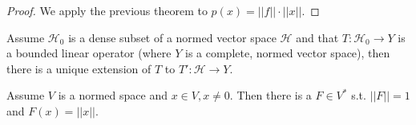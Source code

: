 \ifdetailed
\begin{proof}
    We apply the previous theorem to \(p(x)=||f||\cdot ||x||\).
\end{proof}
\fi 
\begin{theorem}
    Assume \(\mathcal{H}_0\) is a dense subset of a normed vector space \(\mathcal{H}\) and that \(T:\mathcal{H}_0\rightarrow Y\) is a bounded linear operator (where \(Y\) is a complete, normed vector space), then there is a unique extension of \(T\) to \(T':\mathcal{H}\rightarrow Y\).
\end{theorem}
\begin{corollary}
    Assume \(V\) is a normed space and \(x\in V, x\neq0\). Then there is a \(F\in V^*\) s.t. \(||F||=1\) and \(F(x) = ||x||\).
\end{corollary}

